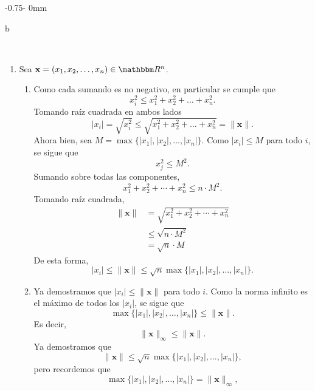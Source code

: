 \begin{adjustwidth}{-0.75\marginparsep - \marginparwidth}{0mm}
\begin{multicols}{2}
\end{multicols}
\end{adjustwidth}

\newpage

\respuestasPage
\twocolumn


b

\newpage
\,

\newpage



\begin{enumerate}
    \item Sea $\mathbf{x} = (x_1, x_2, \dots, x_n) \in \RR[n]$.
    \begin{enumerate}
        \item Como cada sumando es no negativo, en particular se cumple que
        $$x_i^2 \leq x_1^2 + x_2^2 + \dots + x_n^2.$$
        Tomando raíz cuadrada en ambos lados
        $$|x_i| = \sqrt{x_i^2} \leq \sqrt{x_1^2 + x_2^2 + \dots + x_n^2} = \| \mathbf{x} \|.$$
        Ahora bien, sea $M = \max \{|x_1|, |x_2|, \dots, |x_n|\}$. Como $|x_i| \leq M$ para todo $i$, se sigue que
        $$x_j^2 \leq M^2.$$
        Sumando sobre todas las componentes,
        $$x_1^2 + x_2^2 + \cdots + x_n^2 \leq n \cdot M^2.$$
        Tomando raíz cuadrada,
        \begin{align*}
            \| \mathbf{x} \| & = \sqrt{x_1^2 + x_2^2 + \cdots + x_n^2} \\
            & \leq \sqrt{n \cdot M^2} \\
            & = \sqrt{n} \cdot M
        \end{align*}
        De esta forma,
        $$|x_i| \leq \| \mathbf{x} \| \leq \sqrt{n} \max \{ |x_1|, |x_2|, \dots, |x_n|\}.$$
        \item Ya demostramos que $|x_i| \leq \| \mathbf{x} \|$ para todo $i$. Como la norma infinito es el máximo de todos los $|x_i|$, se sigue que
        $$\max \{ |x_1|, |x_2|, \dots, |x_n| \} \leq \| \mathbf{x} \|.$$
        Es decir,
        $$\| \mathbf{x} \|_{\infty} \leq \| \mathbf{x} \|.$$
        Ya demostramos que
        $$\| \mathbf{x} \| \leq \sqrt{n} \max \{ |x_1|, |x_2|, \dots, |x_n|\},$$
        pero recordemos que
        $$\max \{|x_1|, |x_2|, \dots, |x_n|\} = \| \mathbf{x} \|_{\infty},$$

\end{enumerate}
\end{enumerate}
